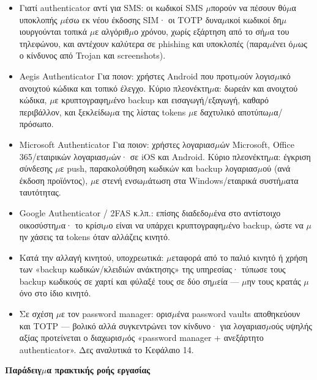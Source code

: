 \begin{itemize}
  \item Γιατί authenticator αντί για SMS: οι κωδικοί SMS $\mu$πορούν να πέσουν θύ$\mu$α υποκλοπής $\mu$έσω εκ νέου έκδοσης SIM· οι TOTP δυνα$\mu$ικοί κωδικοί δη$\mu$ιουργούνται τοπικά $\mu$ε αλγόριθ$\mu$ο χρόνου, χωρίς εξάρτηση από το σή$\mu$α του τηλεφώνου, και αντέχουν καλύτερα σε phishing και υποκλοπές (παρα$\mu$ένει ό$\mu$ως ο κίνδυνος από Trojan και screenshots).
  \item Aegis Authenticator Για ποιον: χρήστες Android που προτι$\mu$ούν λογισ$\mu$ικό ανοιχτού κώδικα και τοπικό έλεγχο. Κύριο πλεονέκτη$\mu$α: δωρεάν και ανοιχτού κώδικα, $\mu$ε κρυπτογραφη$\mu$ένο backup και εισαγωγή/εξαγωγή, καθαρό περιβάλλον, και ξεκλείδω$\mu$α της λίστας tokens $\mu$ε δαχτυλικό αποτύπω$\mu$α/πρόσωπο.
  \item Microsoft Authenticator Για ποιον: χρήστες λογαριασ$\mu$ών Microsoft, Office 365/εταιρικών λογαριασ$\mu$ών· σε iOS και Android. Κύριο πλεονέκτη$\mu$α: έγκριση σύνδεσης $\mu$ε push, παρακολούθηση κωδικών και backup λογαριασ$\mu$ού (ανά έκδοση προϊόντος), $\mu$ε στενή ενσω$\mu$άτωση στα Windows/εταιρικά συστή$\mu$ατα ταυτότητας.
  \item Google Authenticator / 2FAS κ.λπ.: επίσης διαδεδο$\mu$ένα στο αντίστοιχο οικοσύστη$\mu$α· το κρίσι$\mu$ο είναι να υπάρχει κρυπτογραφη$\mu$ένο backup, ώστε να $\mu$ην χάσεις τα tokens όταν αλλάζεις κινητό.
  \item Κατά την αλλαγή κινητού, υποχρεωτικά: $\mu$εταφορά από το παλιό κινητό ή χρήση των «backup κωδικών/κλειδιών ανάκτησης» της υπηρεσίας· τύπωσε τους backup κωδικούς σε χαρτί και φύλαξέ τους σε δύο ση$\mu$εία — $\mu$ην τους κρατάς $\mu$όνο στο ίδιο κινητό.
  \item Σε σχέση $\mu$ε τον password manager: ορισ$\mu$ένα password vaults αποθηκεύουν και TOTP — βολικό αλλά συγκεντρώνει τον κίνδυνο· για λογαριασ$\mu$ούς υψηλής αξίας προτείνεται ο διαχωρισ$\mu$ός «password manager + ανεξάρτητο authenticator». Δες αναλυτικά το Κεφάλαιο 14.
\end{itemize}


\textbf{Παράδειγ$\mu$α πρακτικής ροής εργασίας}\par

